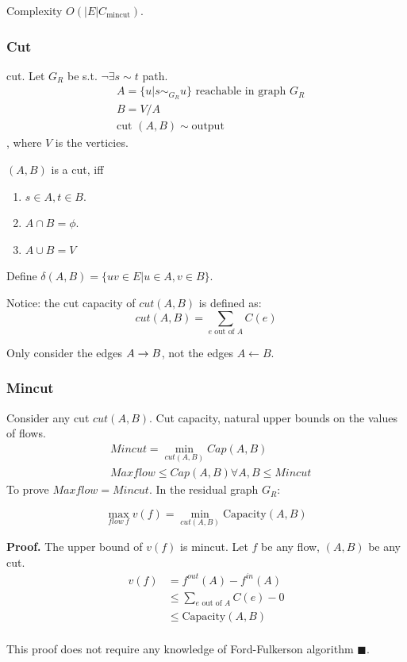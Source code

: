 \documentclass[a4paper]{report}
\theoremstyle{definition}
\begin{document}
Complexity $O(|E| C_{\text{mincut}})$.
\subsubsection{Cut}
cut. Let $G_R$ be s.t. $\neg \exists s\sim t$ path.
\begin{align*}
& A = \{u| s\sim_{G_R} u\} \text{ reachable in graph $G_R$}\\
& B = V/A\\
& \text{cut } (A, B) \sim \text{output}
\end{align*}
, where $V$ is the verticies.

$(A, B)$ is a cut, iff
\begin{enumerate}
\item $s\in A, t\in B$.
\item $A\cap B = \phi$.
\item $A\cup B = V$
\end{enumerate}
Define $\delta(A,B)=\{uv\in E| u\in A, v\in B\}$.

Notice: the cut capacity of $cut(A,B)$ is defined as:
$$
cut(A, B) = \sum_{e \text{ out of }A}C(e)
$$

Only consider the edges $A\rightarrow B$, not the edges $A \leftarrow B$.

\subsubsection{Mincut}
Consider any cut $cut(A,B)$. Cut capacity, natural upper bounds on the values of flows.
\begin{align*}
& Mincut = \min_{cut(A,B)} Cap(A, B)\\
& Maxflow \leq Cap(A, B) \forall A, B \leq Mincut
\end{align*}
To prove $Maxflow = Mincut$. In the residual graph $G_R$:

$$
\max_{flow~f} v(f) = \min_{cut(A, B)} \text{Capacity}(A,B)
$$

\textbf{Proof.} The upper bound of $v(f)$ is mincut. Let $f$ be any flow, $(A,B)$ be any cut.
\begin{align*}
v(f) &= f^{out}(A)-f^{in}(A) \\
&\leq \sum_{e \text{ out of }A}C(e) - 0\\
&\leq \text{Capacity}(A, B) \\
\end{align*}

This proof does not require any knowledge of Ford-Fulkerson algorithm $\blacksquare$.
\end{document}
